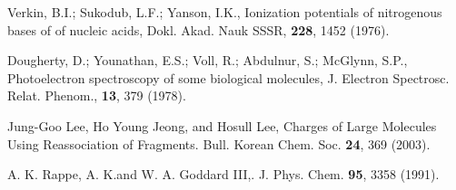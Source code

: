 \documentclass[10pt,showpacs,twocolumn]{revtex4}
\begin{document}
\begin{thebibliography}{}
Verkin, B.I.; Sukodub, L.F.; Yanson, I.K., 
Ionization potentials of nitrogenous bases of of nucleic acids, 
Dokl. Akad. Nauk SSSR, \textbf{228}, 1452 (1976).

Dougherty, D.; Younathan, E.S.; Voll, R.; Abdulnur, S.; McGlynn, S.P., 
Photoelectron spectroscopy of some biological molecules, 
J. Electron Spectrosc. Relat. Phenom., \textbf{13}, 379 (1978).

Jung-Goo Lee, Ho Young Jeong, and Hosull Lee, Charges of
Large Molecules Using Reassociation of Fragments. 
Bull. Korean Chem. Soc. \textbf{24}, 369 (2003).

A. K. Rappe, A. K.and W. A. Goddard III,. 
J. Phys. Chem. \textbf{95}, 3358 (1991).


\end{thebibliography}
\end{document}
